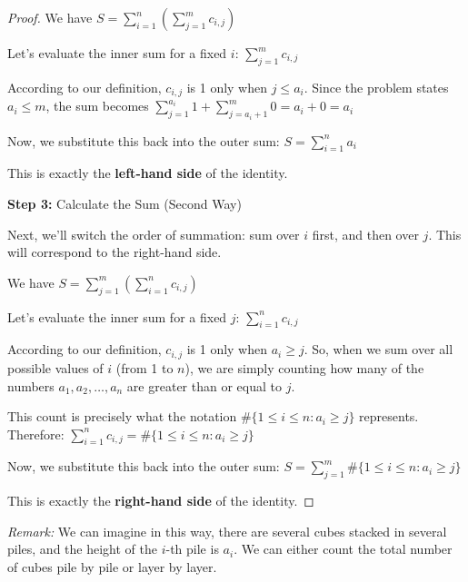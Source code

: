 \documentclass{article}
\begin{document}
\begin{proof}
    We have
    \(
    S = \sum_{i=1}^{n} \left( \sum_{j=1}^{m} c_{i,j} \right)
    \)

    Let's evaluate the inner sum for a fixed \( i \):
    \(
    \sum_{j=1}^{m} c_{i,j}
    \)

    According to our definition, \( c_{i,j} \) is 1 only when \( j \leq a_i \). Since the problem states \( a_i \leq m \), the sum becomes
    \(
    \sum_{j=1}^{a_i} 1 + \sum_{j=a_i+1}^{m} 0 = a_i + 0 = a_i
    \)

    Now, we substitute this back into the outer sum:
    \(
    S = \sum_{i=1}^{n} a_i
    \)

    This is exactly the \textbf{left-hand side} of the identity.

    \textbf{Step 3:} Calculate the Sum (Second Way)

    Next, we'll switch the order of summation: sum over \( i \) first, and then over \( j \). This will correspond to the right-hand side.

    We have
    \(
    S = \sum_{j=1}^{m} \left( \sum_{i=1}^{n} c_{i,j} \right)
    \)

    Let's evaluate the inner sum for a fixed \( j \):
    \(
    \sum_{i=1}^{n} c_{i,j}
    \)

    According to our definition, \( c_{i,j} \) is 1 only when \( a_i \geq j \). So, when we sum over all possible values of \( i \) (from 1 to \( n \)), we are simply counting how many of the numbers \( a_1, a_2, \dots, a_n \) are greater than or equal to \( j \).

    This count is precisely what the notation \( \#\{1 \leq i \leq n : a_i \geq j\} \) represents. Therefore:
    \(
    \sum_{i=1}^{n} c_{i,j} = \#\{1 \leq i \leq n : a_i \geq j\}
    \)

    Now, we substitute this back into the outer sum:
    \(
    S = \sum_{j=1}^{m} \#\{1 \leq i \leq n : a_i \geq j\}
    \)

    This is exactly the \textbf{right-hand side} of the identity.
\end{proof}

\textit{Remark:} We can imagine in this way, there are several cubes stacked in several
piles, and the height of the $i$-th pile is $a_i$. We can either count the total number of cubes
pile by pile or layer by layer.
\end{document}
